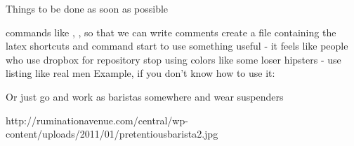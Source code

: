 
Things to be done as soon as possible

commands like \ruzica, \mark, \alex so that we can write comments
create a file containing the latex shortcuts and command
start to use something useful - it feels like people who use dropbox for repository
stop using colors like some loser hipsters - use listing like real men
Example, if you don't know how to use it:
 

Or just go and work as baristas somewhere and wear suspenders 

http://ruminationavenue.com/central/wp-content/uploads/2011/01/pretentiousbarista2.jpg